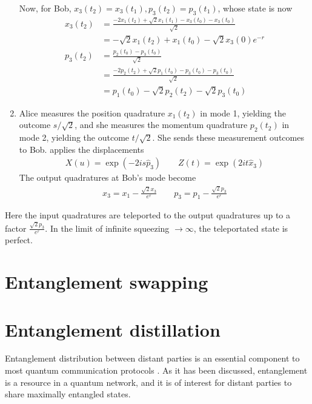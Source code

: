 \documentclass[reprint,
superscriptaddress,
 amsmath,amssymb,
 aps,
prb,
]{revtex4-1}
\begin{document}
\begin{enumerate}
\color{blue}
 Now, for Bob, $x_3(t_2) = x_3 (t_1),p_3(t_2) = p_3 (t_1)$, whose state is now
\begin{align}
 x_3 (t_2) &= \frac{-2 x_1(t_2)+ \sqrt 2x_1(t_1) - x_3(t_0) - x_3(t_0)}{\sqrt 2} \nonumber\\
		   &= -\sqrt 2 x_1(t_2 ) + x_1(t_0) - \sqrt 2 x_3(0)e^{-r} \\
p_3 (t_2) &=   \frac{p_2(t_0) - p_3(t_0)}{\sqrt 2} \\
		  &=   \frac{-  2p_2(t_2)  + \sqrt 2 p_1 (t_0) - p_3 (t_0) - p_3(t_0)}{\sqrt 2} \\
		  &=  p_1(t_0)- \sqrt2p_2(t_2) - \sqrt2 p_3 (t_0)
\end{align}

\item Alice measures the position quadrature $x_1(t_2)$ in mode 1, yielding
the outcome $s/\sqrt2$, and she measures the momentum quadrature
$p_2(t_2)$ in mode 2, yielding the outcome $t/\sqrt2$. She sends these measurement outcomes to Bob.
\noindent applies the displacements
\begin{align}
X(u) = \exp(-2 i s \hat p_3) \qquad Z(t) = \exp(2i t \hat x_3)
\end{align}
The output quadratures at Bob's mode become
\begin{align}
x_3 = x_1 -\frac{\sqrt2 x_3}{e^r} \qquad p_3 = p_1 - \frac{\sqrt2 p_3}{e^r}
\end{align}
\end{enumerate}

Here the input quadratures are teleported to the output quadratures up to a factor $\frac{\sqrt2 p_3}{e^r}$. In the limit of infinite squeezing $\rightarrow \infty$, the teleportated state is perfect.



\section{Entanglement swapping}

\section{Entanglement distillation}

Entanglement distribution between distant parties is an essential component to most quantum communication protocols \cite{PhysRevLett.81.5932}. As it has been discussed, entanglement is a resource in a quantum network, and it is of interest for distant parties to share maximally entangled states. 
\end{document}
